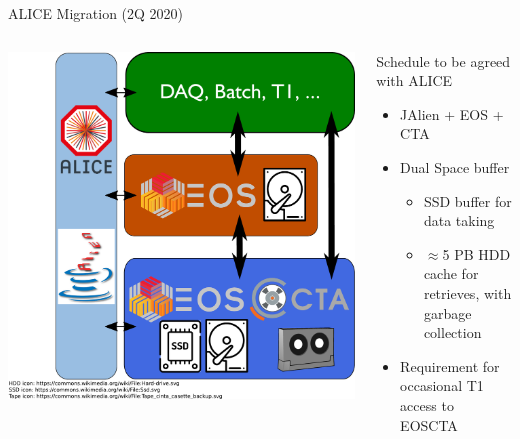 \documentclass[aspectratio=1610]{beamer}
\begin{document}
\begin{frame}{ALICE Migration (2Q 2020)}
\begin{columns}
	\begin{column}{0.4\textwidth}
		\begin{center}
		  \includegraphics[width=\textwidth]{images/CTA_Deployment_ALICE.pdf}
		\end{center}
	\end{column}
	\begin{column}{0.55\textwidth}
      Schedule to be agreed with ALICE\\[1ex]
		\begin{itemize}
         \item JAlien + EOS + CTA
         \item Dual Space buffer
		\begin{itemize}
		  \item SSD buffer for data taking
		  \item $\approx$5 PB HDD cache for retrieves, with garbage collection
		\end{itemize}
		  \item Requirement for occasional T1 access to EOSCTA
		\end{itemize}
	\end{column}
\end{columns}
\end{frame}
\end{document}
